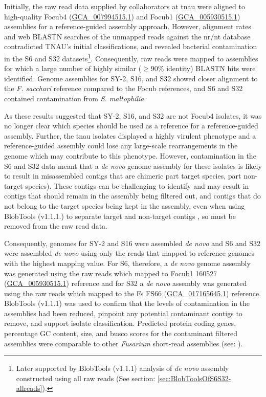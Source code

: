 Initially, the raw read data supplied by collaborators at \ac{tnau} were aligned to high-quality \ac{Focub4} (\href{https://www.ncbi.nlm.nih.gov/datasets/genome/GCA_007994515.1/}{GCA\_007994515.1}) and \ac{Focub1} (\href{https://www.ncbi.nlm.nih.gov/datasets/genome/GCA_005930515.1/}{GCA\_005930515.1})  assemblies for a reference-guided assembly approach. However, alignment rates and web BLASTN searches of the unmapped reads against the nr/nt database contradicted TNAU's initial classifications, and revealed bacterial contamination in the S6 and S32 datasets\footnote{Later supported by BlobTools (v1.1.1) analysis of \textit{de novo} assembly constructed using all raw reads (See section: \ref{sec:BlobToolsOfS6S32-allreads}).}. Consequently, raw reads were  mapped to assemblies for which a large number of highly similar ($ \geq90\% $ identity) BLASTN hits were identified. Genome assemblies for SY-2, S16, and S32 showed closer alignment to the \textit{F. sacchari} reference compared to the \ac{Focub} references, and S6 and S32 contained contamination from \textit{S. maltophilia}. 

As these results suggested that SY-2, S16, and S32 are not \ac{Focub4} isolates, it was no longer clear which species should be used as a reference for a reference-guided assembly. Further, the \ac{tnau} isolates displayed a highly virulent phenotype and a reference-guided assembly could lose any large-scale rearrangements in the genome which may contribute to this phenotype. However, contamination in the S6 and S32 data meant that a \textit{de novo} genome assembly for these isolates is likely to result in misassembled contigs that are chimeric part target species, part non-target species). These contigs can be challenging to identify and may result in contigs that should remain in the assembly being filtered out, and contigs that do not belong to the target species being kept in the assembly, even when using BlobTools (v1.1.1.) to separate target and non-target contigs \parencite{Cornet2022}, so must be removed from the raw read data. 

Consequently, genomes for SY-2 and S16 were assembled \textit{de novo} and S6 and S32 were assembled \textit{de novo} using only the reads that mapped to reference genomes with the highest mapping value. For S6, therefore, a \textit{de novo} genome assembly was generated using the raw reads which mapped to \ac{Focub1} 160527 (\href{https://www.ncbi.nlm.nih.gov/datasets/genome/GCA_005930515.1/}{GCA\_005930515.1}) reference and for S32 a \textit{de novo} assembly was generated using the raw reads which mapped to the \ac{Fs} FS66 (\href{https://www.ncbi.nlm.nih.gov/datasets/genome/GCA_017165645.1/}{GCA\_017165645.1}) reference. BlobTools (v1.1.1) was used to confirm that the levels of contamination in the assemblies had been reduced, pinpoint any potential contaminant contigs to remove, and support isolate classification. Predicted protein coding genes, percentage GC content, size, and \ac{busco} scores for the contaminant filtered assemblies were comparable to other \textit{Fusarium} short-read assemblies (see: \textcite{DitaHerai2013, Chiara2015, Srivastava2018}).

